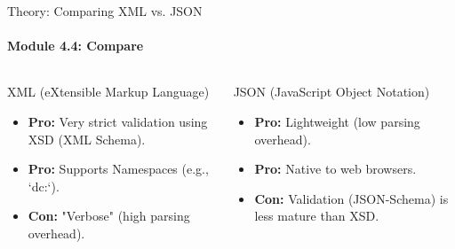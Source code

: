 \begin{frame}{Theory: Comparing XML vs. JSON}
    \framesubtitle{Module 4.4: Compare}
    \begin{columns}
        \begin{block}{XML (eXtensible Markup Language)}
            \begin{itemize}
                \item \textbf{Pro:} Very strict validation using XSD (XML Schema).
                \item \textbf{Pro:} Supports Namespaces (e.g., `dc:`).
                \item \textbf{Con:} "Verbose" (high parsing overhead).
            \end{itemize}
        \end{block}
        
        \begin{block}{JSON (JavaScript Object Notation)}
            \begin{itemize}
                \item \textbf{Pro:} Lightweight (low parsing overhead).
                \item \textbf{Pro:} Native to web browsers.
                \vspace{3.2ex}
                \item \textbf{Con:} Validation (JSON-Schema) is less mature than XSD.
            \end{itemize}
            
        \end{block}
    \end{columns}
\end{frame}

